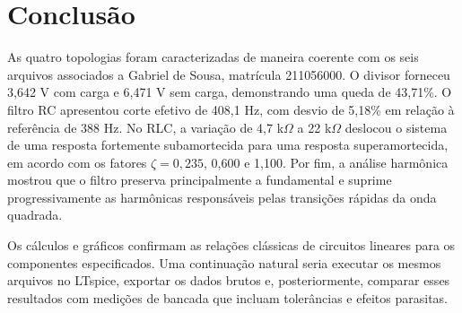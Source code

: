 \documentclass[10pt,journal,onecolumn,a4paper]{IEEEtran}
\begin{document}
\section{Conclusão}

As quatro topologias foram caracterizadas de maneira coerente com os seis arquivos associados a
Gabriel de Sousa, matrícula 211056000. O divisor forneceu 3,642 V com carga e 6,471 V sem carga,
demonstrando uma queda de 43,71\%. O filtro RC apresentou corte efetivo de 408,1 Hz, com desvio de
5,18\% em relação à referência de 388 Hz. No RLC, a variação de 4,7 k$\Omega$ a 22 k$\Omega$
deslocou o sistema de uma resposta fortemente subamortecida para uma resposta superamortecida, em
acordo com os fatores $\zeta=0{,}235$, 0,600 e 1,100. Por fim, a análise harmônica mostrou que o
filtro preserva principalmente a fundamental e suprime progressivamente as harmônicas responsáveis
pelas transições rápidas da onda quadrada.

Os cálculos e gráficos confirmam as relações clássicas de circuitos lineares para os componentes
especificados. Uma continuação natural seria executar os mesmos arquivos no LTspice, exportar os
dados brutos e, posteriormente, comparar esses resultados com medições de bancada que incluam
tolerâncias e efeitos parasitas.



\end{document}
